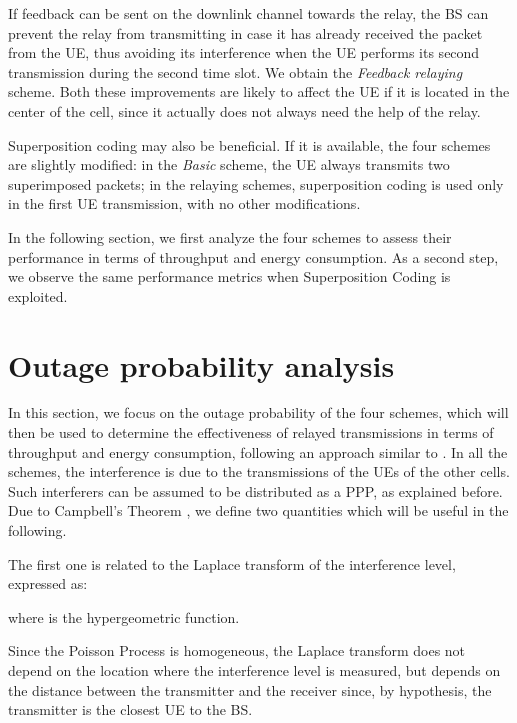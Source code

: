 \documentclass[12pt, letterpaper, onecolumn, draftcls]{IEEEtran}
\begin{document}
If feedback can be sent on the downlink channel towards the relay, the BS can prevent the relay from transmitting in case it has already received the packet from the UE, thus avoiding its interference when the UE performs its second transmission during the second time slot. We obtain the \textit{Feedback relaying} scheme.
Both these improvements are likely to affect the UE if it is located in the center of the cell, since it actually does not always need the help of the relay.

Superposition coding may also be beneficial. If it is available, the four schemes are slightly modified: in the \textit{Basic} scheme, the UE always transmits two superimposed packets; in the relaying schemes, superposition coding is used only in the first UE transmission, with no other modifications.

In the following section, we first analyze the four schemes to assess their performance in terms of throughput and energy consumption. As a second step, we observe the same performance metrics when Superposition Coding is exploited.









\section{Outage probability analysis}
\label{out_prob}
In this section, we focus on the outage probability of the four schemes, which will then be used to determine the effectiveness of relayed transmissions in terms of throughput and energy consumption, following an approach similar to \cite{Haenggi, relOFDM}.
In all the schemes, the interference is due to the transmissions of the UEs of the other cells. Such interferers can be assumed to be distributed as a PPP, as explained before. Due to Campbell's Theorem \cite{Mecke}, we define two quantities which will be useful in the following.

The first one is related to the Laplace transform of the interference level, expressed as:

where  is the hypergeometric function\cite{inte}.

Since the Poisson Process is homogeneous, the Laplace transform does not depend on the location where the interference level is measured, but depends on the distance  between the transmitter and the receiver since, by hypothesis, the transmitter is the closest UE to the BS.
\end{document}
